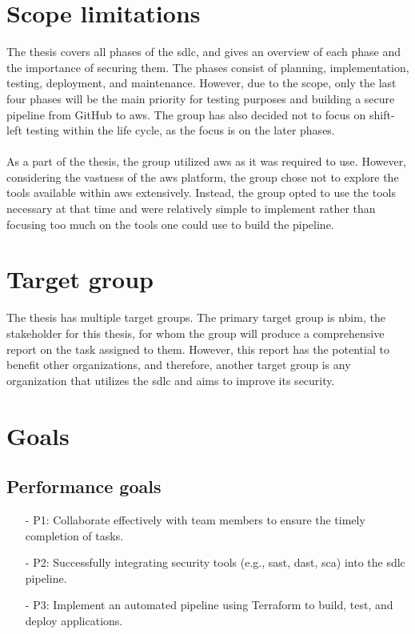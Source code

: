  
\section{Scope limitations}
The thesis covers all phases of the \acrlong{sdlc}, and gives an overview of each phase and the importance of securing them. The phases consist of planning, implementation, testing, deployment, and maintenance. However, due to the scope, only the last four phases will be the main priority for testing purposes and building a secure pipeline from GitHub to \acrshort{aws}. The group has also decided not to focus on \gls{shift-left} testing within the life cycle, as the focus is on the later phases. 
\\~\\
As a part of the thesis, the group utilized \acrshort{aws} as it was required to use. However, considering the vastness of the \acrshort{aws} platform, the group chose not to explore the tools available within \acrshort{aws} extensively. Instead, the group opted to use the tools necessary at that time and were relatively simple to implement rather than focusing too much on the tools one could use to build the pipeline.
\newpage
\section{Target group}
The thesis has multiple target groups. The primary target group is \acrshort{nbim}, the stakeholder for this thesis, for whom the group will produce a comprehensive report on the task assigned to them. However, this report has the potential to benefit other organizations, and therefore, another target group is any organization that utilizes the \acrshort{sdlc} and aims to improve its security.

\section{Goals}
\subsection{Performance goals}
\begin{itemize}
    \item[-] P1: Collaborate effectively with team members to ensure the timely completion of tasks. 
    
    \item[-] P2: Successfully integrating security tools (e.g., \acrshort{sast}, \acrshort{dast}, \acrshort{sca}) into the \acrshort{sdlc} pipeline. 
    
    \item[-] P3: Implement an automated pipeline using Terraform to build, test, and deploy applications.
\end{itemize}

